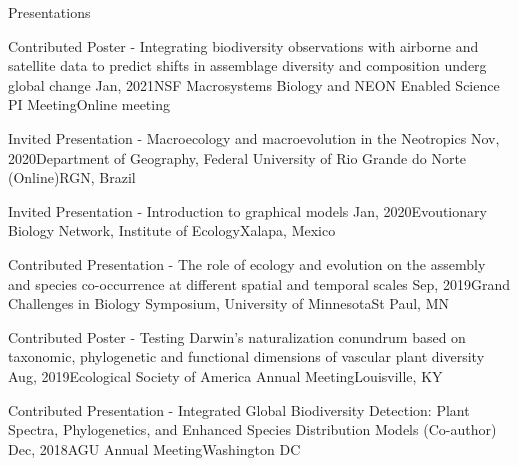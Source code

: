 \documentclass{resume} %
\begin{document}
\begin{rSection}{Presentations}
\begin{sSubsection}{Contributed Poster - Integrating biodiversity observations with airborne and satellite data to predict shifts in assemblage diversity and composition underg global change}{ }{Jan, 2021}{NSF Macrosystems Biology and NEON Enabled Science PI Meeting}{Online meeting}
\end{sSubsection}

\begin{sSubsection}{Invited Presentation - Macroecology and macroevolution in the Neotropics}{ }{Nov, 2020}{Department of Geography, Federal University of Rio Grande do Norte (Online)}{RGN, Brazil}
\end{sSubsection}

\begin{sSubsection}{Invited Presentation - Introduction to graphical models}{ }{Jan, 2020}{Evoutionary Biology Network, Institute of Ecology}{Xalapa, Mexico}
\end{sSubsection}

\begin{sSubsection}{Contributed Presentation - The role of ecology and evolution on the assembly and species co-occurrence at different spatial and temporal scales}{ }{Sep, 2019}{Grand Challenges in Biology Symposium, University of Minnesota}{St Paul, MN}
\end{sSubsection}

\begin{sSubsection}{Contributed Poster - Testing Darwin's naturalization conundrum based on taxonomic, phylogenetic and functional dimensions of vascular plant diversity}{ }{Aug, 2019}{Ecological Society of America Annual Meeting}{Louisville, KY}
\end{sSubsection}


\begin{sSubsection}{Contributed Presentation - Integrated Global Biodiversity Detection: Plant Spectra, Phylogenetics, and Enhanced Species Distribution Models}{ (Co-author) }{Dec, 2018}{AGU Annual Meeting}{Washington DC}
\end{sSubsection}



\end{rSection}
\end{document}
